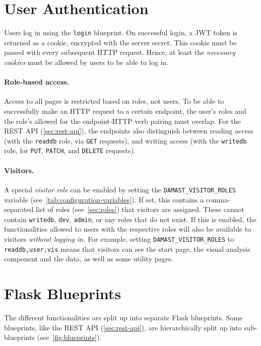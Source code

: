 \section{User Authentication}
\label{sec:user-authentication}

Users log in using the \verb!login! blueprint.
On successful login, a JWT token is returned as a cookie, encrypted with the server secret.
This cookie must be passed with every subsequent HTTP request.
Hence, at least the \emph{necessary cookies} must be allowed by users to be able to log in.

\paragraph*{Role-based access.}
Access to all pages is restricted based on roles, not users.
To be able to successfully make an HTTP request to a certain endpoint, the user's roles and the role's allowed for the endpoint-HTTP verb pairing must overlap.
For the REST API (\cref{sec:rest-api}), the endpoints also distinguish between reading access (with the \verb!readdb! role, via \verb!GET! requests), and writing access (with the \verb!writedb! role, for \verb!PUT!, \verb!PATCH!, and \verb!DELETE! requests).

\paragraph*{Visitors.}
\label{sec:visitors}
A special \emph{visitor role} can be enabled by setting the \verb!DAMAST_VISITOR_ROLES! variable (see~\cref{tab:configuration-variables}).
If set, this contains a comma-separated list of roles (see~\cref{sec:roles}) that visitors are assigned.
These cannot contain \verb!writedb!, \verb!dev!, \verb!admin!, or any roles that do not exist.
If this is enabled, the functionalities allowed to users with the respective roles will also be available to visitors \emph{without logging in.}
For example, setting \verb!DAMAST_VISITOR_ROLES! to \verb!readdb,user,vis! means that visitors can see the start page, the visual analysis component and the data, as well as some utility pages.


\section{Flask Blueprints}
\label{sec:blueprints}

The different functionalities are split up into separate Flask blueprints.
Some blueprints, like the REST API (\cref{sec:rest-api}), are hierarchically split up into sub-blueprints (see~\cref{fig:blueprints}).

